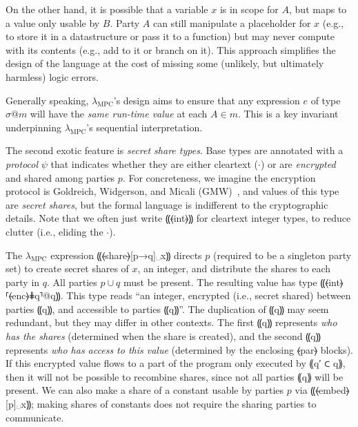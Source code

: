 \documentclass{report}
\newcommand{\mpc}{\ensuremath{\lambda_{\mathrm{MPC}}}\xspace}
\begin{document}
On the other hand, it is possible that a variable $x$ is in scope for
$A$, but maps to a value only usable by $B$. Party $A$ can
still manipulate a placeholder for $x$ (e.g., to store it in a
datastructure or pass it to a function) but may never compute with its
contents (e.g., add to it or branch on it). This approach
simplifies the design of the language at the cost of missing some
(unlikely, but ultimately harmless) logic errors.

Generally speaking, \mpc's design aims to ensure that any expression
$e$ of type $\sigma @ m$ will have the \emph{same run-time value} at
each $A \in m$. This is a key invariant underpinning \mpc's sequential
interpretation.

The second exotic feature is \emph{secret share types}.
Base types are annotated with a
\emph{protocol} $\psi$ that indicates whether they are either
cleartext ($\cdot$) or are \emph{encrypted} and shared among parties
$p$. For concreteness, we imagine the encryption protocol is
Goldreich, Widgerson, and Micali (GMW)~\citeyear{STOC:GolMicWig87},
and values of this type are \emph{secret shares}, but the formal
language is indifferent to the cryptographic details. Note that we
often just write ⸨⦑int⦒⸩ for cleartext integer types, to reduce
clutter (i.e., eliding the $\cdot$).

The \mpc expression ⸨⦑share⦒[p→q]␣x⸩ directs $p$ (required to be a singleton party set) to
create secret shares of $x$, an integer, and distribute the shares to
each party in
$q$. All parties $p \cup q$ must be present. The resulting value
has type ⸨⦑int⦒⸢⦑enc⦒⋕q⸣@q⸩. This type reads “an integer, encrypted
(i.e., secret shared) between parties ⸨q⸩, and accessible to parties
⸨q⸩”. The duplication of ⸨q⸩ may seem redundant, but they may differ
in other contexts. The first ⸨q⸩ represents \emph{who has the
shares} (determined when the share is created), and the second ⸨q⸩
represents \emph{who has access to this value} (determined by the
enclosing ⦑par⦒ blocks). If this encrypted value flows to a part of
the program only executed by ⸨q′ ⊂ q⸩, then it will not be possible to
recombine shares, since not all parties ⸨q⸩ will be present.
We can also make a share of a constant
usable by parties $p$ via ⸨⦑embed⦒[p]␣x⸩; making shares of
constants does not require the sharing parties to communicate.
\end{document}
